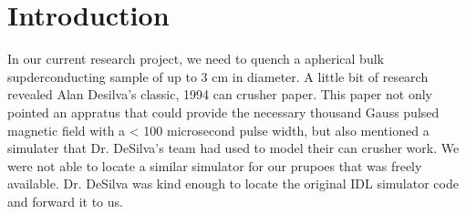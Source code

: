 \documentclass[prb,preprint]{revtex4-1}
\begin{document}
\section{Introduction} %
In our current research project, we need to quench a apherical bulk supderconducting sample of up to 3 cm in diameter.  A little bit of research revealed Alan Desilva's classic, 1994 can crusher paper\cite{desilvacan}.  This paper not only pointed an appratus that could provide the necessary thousand Gauss pulsed magnetic field with a < 100 microsecond pulse width, but also mentioned a simulater that Dr. DeSilva's team had used to model their can crusher work.  We were not able to locate a similar simulator for our prupoes that was freely available.  Dr. DeSilva was kind enough to locate the original IDL simulator code and forward it to us.  
\\
\end{document}
